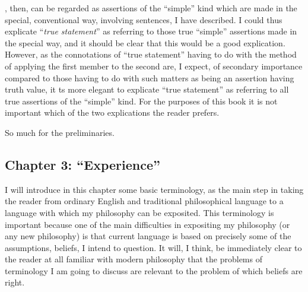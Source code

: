 , then, can be regarded as assertions of the \enquote{simple} kind 
which are made in the special, conventional way, involving sentences, I have 
described. I could thus explicate \enquote{\emph{true statement}} as referring to those true 
\enquote{simple} assertions made in the special way, and it should be clear that this 
would be a good explication. However, as the connotations of \enquote{true 
statement} having to do with the method of applying the first member to the 
second are, I expect, of secondary importance compared to those having to 
do with such matters as being an assertion having truth value, it ts more 
elegant to explicate \enquote{true statement} as referring to all true assertions of the 
\enquote{simple} kind. For the purposes of this book it is not important which of 
the two explications the reader prefers. 

So much for the preliminaries. 

\subsection[Chapter 3: \enquote{Experience}][\enquote{Experience}]{Chapter 3: \enquote{Experience}}

I will introduce in this chapter some basic terminology, as the main step 
in taking the reader from ordinary English and traditional philosophical 
language to a language with which my philosophy can be exposited. This 
terminology is important because one of the main difficulties in expositing 
my philosophy (or any new philosophy) is that current language is based on 
precisely some of the assumptions, beliefs, I intend to question. It will, I 
think, be immediately clear to the reader at all familiar with modern 
philosophy that the problems of terminology I am going to discuss are 
relevant to the problem of which beliefs are right. 

